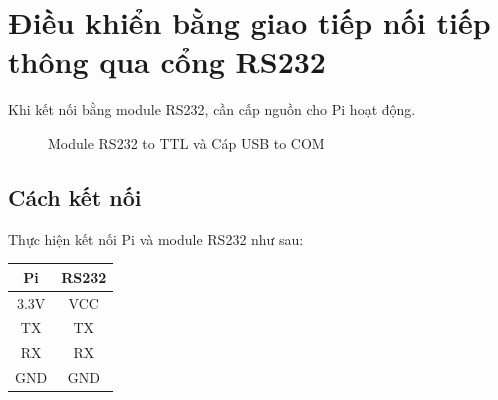 \section{Điều khiển bằng giao tiếp nối tiếp thông qua cổng RS232} \label{Subsec:rs232}
Khi kết nối bằng module RS232, cần cấp nguồn cho Pi hoạt động.
\begin{figure}[!h]
\begin{center}
\hspace{1cm}
\end{center}
\caption{Module RS232 to TTL và Cáp USB to COM}
\end{figure}
\subsection{Cách kết nối}
Thực hiện kết nối Pi và module RS232 như sau:
\begin{center}
\begin{tabular}{c|c}
Pi & RS232\\ \hline
3.3V & VCC\\
TX & TX \\ 
RX & RX\\
GND & GND
\end{tabular}
\end{center}
